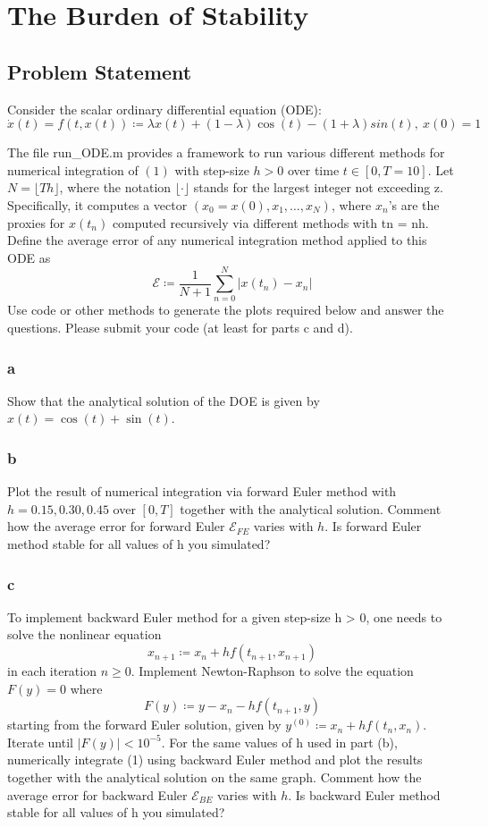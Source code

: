 \documentclass[11pt]{report}
\theoremstyle{definition}
\begin{document}
\section*{The Burden of Stability}
\subsection*{Problem Statement}
Consider the scalar ordinary differential equation (ODE):
\begin{equation}
	\dot{x}(t) = f(t, x(t)) \coloneqq \lambda x(t)+(1-\lambda)\cos(t)-(1+\lambda)sin(t),\ x(0)=1
\end{equation}


The file run\_ODE.m provides a framework to run various different methods for
numerical integration of $(1)$ with step-size $h > 0$ over time $t\in[0,T=10]$.
Let $N=\lfloor Th\rfloor$, where the notation $\lfloor\cdot\rfloor$ stands for
the largest integer not exceeding z. Specifically, it computes a vector $(x_0 =
	x(0), x_1, \ldots, x_N )$, where $x_n$’s are the proxies for $x(t_n)$ computed
recursively via different methods with tn = nh. Define the average error of any
numerical integration method applied to this ODE as
\[ \mathcal{E}\coloneqq \frac{1}{N+1}\sum_{n=0}^{N}|x(t_n)-x_n| \]
Use code or other methods to generate the plots required below and answer the questions.
Please submit your code (at least for parts c and d).

\subsubsection*{a}
Show that the analytical solution of the DOE is given by $x(t)=\cos(t)+\sin(t)$.

\subsubsection*{b}
Plot the result of numerical integration via forward Euler method with
$h=0.15,0.30,0.45$ over $[0,T]$ together with the analytical solution. Comment
how the average error for forward Euler $\mathcal{E}_{FE}$ varies with $h$.  Is
forward Euler method stable for all values of h you simulated?

\subsubsection*{c}
To implement backward Euler method for a given step-size h > 0, one needs to solve the nonlinear
equation
\[x_{n+1} \coloneqq x_n + hf(t_{n+1}, x_{n+1})\]
in each iteration $n\geq 0$. Implement Newton-Raphson to solve the equation $F(y)=0$ where
\[F(y)\coloneqq y-x_n-hf(t_{n+1},y)\]
starting from the forward Euler solution, given by $y^{(0)}\coloneqq x_n +
	hf(t_n,x_n)$.  Iterate until $|F(y)|<10^{-5}$.  For the same values of h used in
part (b), numerically integrate (1) using backward Euler method and plot the
results together with the analytical solution on the same graph. Comment how the
average error for backward Euler $\mathcal{E}_{BE}$ varies with $h$. Is backward
Euler method stable for all values of h you simulated?
\end{document}
